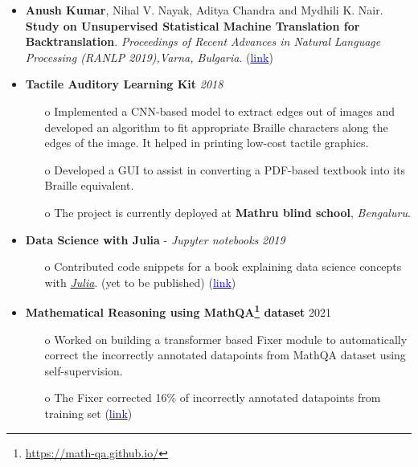\documentclass[11pt,a4paper]{article}
\begin{document}
{
\colorbox{gray}{}
\begin{itemize}
    \item \textbf{Anush Kumar}, Nihal V. Nayak, Aditya Chandra and Mydhili K. Nair. \textbf{Study on Unsupervised Statistical Machine Translation for Backtranslation}. \textit{Proceedings of Recent Advances in Natural Language Processing (RANLP 2019),Varna, Bulgaria}. (\href{https://aclanthology.org/R19-1068/}{\textcolor{blue}{link}}) 
\end{itemize}
}
{
\colorbox{gray}{}
\begin{itemize}
    \item \textbf{Tactile Auditory Learning Kit} \hfill \textit{2018}
    \begin{itemize}
        \item[o] Implemented a CNN-based model to extract edges out of images and developed an algorithm to fit appropriate Braille characters along the edges of the image. It helped in printing low-cost tactile graphics.
        \item[o] Developed a GUI to assist in converting a PDF-based textbook into its Braille equivalent. 
        \item[o] The project is currently deployed at \textbf{Mathru blind school}, \emph{Bengaluru}.
    \end{itemize}
    \item \textbf{Data Science with Julia} - \textit{Jupyter notebooks} \hfill \textit{2019}
    \begin{itemize}
        \item[o] Contributed code snippets for a book explaining data science concepts with \href{https://julialang.org}{\emph{Julia}}. (yet to be published) (\href{https://github.com/anushkumarv/Data_Science_with_Julia}{\textcolor{blue}{link}})
    \end{itemize}
    \item \textbf{Mathematical Reasoning using MathQA\footnote{\url{ https://math-qa.github.io/}} dataset} \hfill 2021
     \begin{itemize}
         \item[o] Worked on building a transformer based Fixer module to automatically correct the incorrectly annotated datapoints from MathQA dataset using self-supervision.
         \item[o] The Fixer corrected 16\% of incorrectly annotated datapoints from training set (\href{https://github.com/anushkumarv/Language_models_explore_numeracy}{\textcolor{blue}{link}}) 
     \end{itemize}   
\end{itemize}
}
\end{document}

